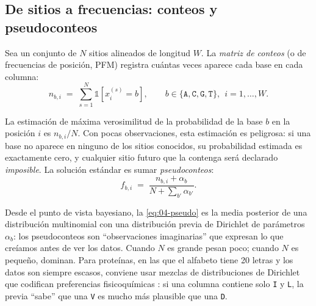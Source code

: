 \subsection{De sitios a frecuencias: conteos y pseudoconteos}

Sea un conjunto de $N$ sitios alineados de longitud $W$. La \emph{matriz de conteos} (o de frecuencias de posición, PFM) registra cuántas veces aparece cada base en cada columna:
\begin{equation}\label{eq:04-conteos}
n_{b,i} \;=\; \sum_{s=1}^{N} \mathbb{1}\!\left[x^{(s)}_i = b\right], \qquad b\in\{\texttt{A},\texttt{C},\texttt{G},\texttt{T}\},\ \ i=1,\dots,W.
\end{equation}

\begin{simbolos}
\end{simbolos}

La estimación de máxima verosimilitud de la probabilidad de la base $b$ en la posición $i$ es $n_{b,i}/N$. Con pocas observaciones, esta estimación es peligrosa: si una base no aparece en ninguno de los sitios conocidos, su probabilidad estimada es exactamente cero, y cualquier sitio futuro que la contenga será declarado \emph{imposible}. La solución estándar es sumar \emph{pseudoconteos}:
\begin{equation}\label{eq:04-pseudo}
f_{b,i} \;=\; \frac{n_{b,i} + \alpha_b}{N + \sum_{b'}\alpha_{b'}}.
\end{equation}

\begin{simbolos}
\end{simbolos}

\noindent Desde el punto de vista bayesiano, la \cref{eq:04-pseudo} es la media posterior de una distribución multinomial con una distribución previa de Dirichlet de parámetros $\alpha_b$: los pseudoconteos son ``observaciones imaginarias'' que expresan lo que creíamos antes de ver los datos. Cuando $N$ es grande pesan poco; cuando $N$ es pequeño, dominan. Para proteínas, en las que el alfabeto tiene 20 letras y los datos son siempre escasos, conviene usar mezclas de distribuciones de Dirichlet que codifican preferencias fisicoquímicas \parencite{c04-sjolander1996}: si una columna contiene solo \texttt{I} y \texttt{L}, la previa ``sabe'' que una \texttt{V} es mucho más plausible que una \texttt{D}.

